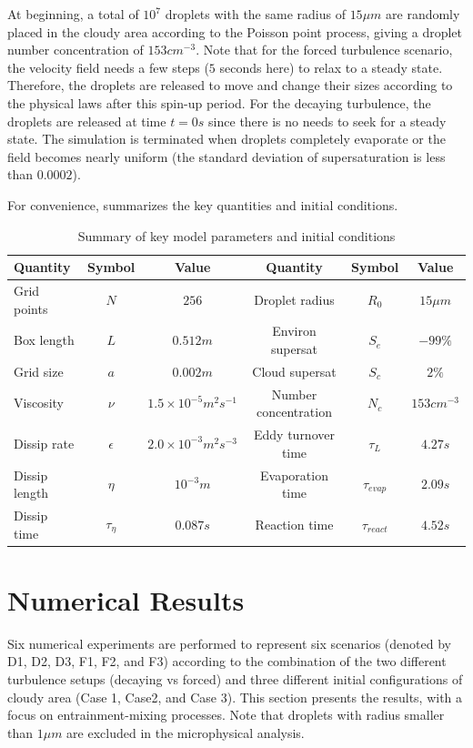 \documentclass[draft,jgrga]{AGUTeX}
\begin{document}
\begin{article}
At beginning, a total of $10^{7}$ droplets with the same radius of $15\mu m$ are randomly placed in the cloudy area according to the Poisson point process, giving a droplet number concentration of $153{cm}^{-3}$. Note that for the forced turbulence scenario, the velocity field needs a few steps ($5$ seconds here) to relax to a steady state. Therefore, the droplets are released to move and change their sizes according to the physical laws after this spin-up period. For the decaying turbulence, the droplets are released at time $t = 0s$ since there is no needs to seek for a steady state. The simulation is terminated when droplets completely evaporate or the field becomes nearly uniform (the standard deviation of supersaturation is less than $0.0002$). 

For convenience,  summarizes the key quantities and initial conditions.
\begin{table}[T]
\begin{tabular}{l c c c c c}
\hline\hline
Quantity & Symbol & Value & Quantity & Symbol & Value\\
\hline
Grid points & $N$ & $256$ & Droplet radius & $R_{0}$ & $15\mu m$\\
Box length & $L$ & $0.512m$ & Environ supersat & $S_{e}$ & $-99\%$\\
Grid size & $a$ & $0.002m$ & Cloud supersat & $S_{c}$ & $2\%$\\
Viscosity & $\nu$ & $1.5\times10^{-5}m^{2}s^{-1}$ & Number concentration& $N_{c}$ & $153cm^{-3}$\\
Dissip rate& $\epsilon$ & $2.0\times10^{-3}m^{2}s^{-3}$ & Eddy turnover time & $\tau_{L}$ & $4.27s$\\
Dissip length& $\eta$ & $10^{-3}m$ & Evaporation time & $\tau_{evap}$ & $2.09s$\\
Dissip time& $\tau_{\eta}$ & $0.087s$ & Reaction time & $\tau_{react}$ & $4.52s$\\
\hline
\end{tabular}
\caption{Summary of key model parameters and initial conditions}
\label{tb:parameters}
\end{table}

\section{Numerical Results}\label{numerical_results}
Six numerical experiments are performed to represent six scenarios (denoted by D1, D2, D3, F1, F2, and F3) according to the combination of the two different turbulence setups (decaying vs forced) and three different initial configurations of cloudy area (Case 1, Case2, and Case 3). This section presents the results, with a focus on entrainment-mixing processes. Note that droplets with radius smaller than $1\mu m$ are excluded in the microphysical analysis. 


\end{article}
\end{document}
